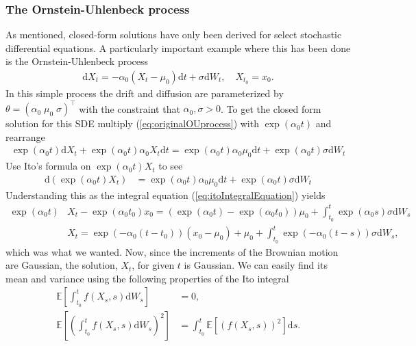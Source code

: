 \subsubsection{The Ornstein-Uhlenbeck process}
As mentioned, closed-form solutions have only been derived for select stochastic differential equations. A particularly important example where this has been done is the Ornstein-Uhlenbeck process
\begin{align}
    \mathrm{d}X_t = -\alpha_0\left(X_t - \mu_0\right)\mathrm{d}t + \sigma \mathrm{d}W_t, \quad X_{t_0} = x_0. \label{eq:originalOUprocess}
\end{align}
In this simple process the drift and diffusion are parameterized by $\theta = \left(\alpha_0\; \mu_0\; \sigma\right)^\top$ with the constraint that $\alpha_0, \sigma>0$.
To get the closed form solution for this SDE multiply (\ref{eq:originalOUprocess}) with $\exp\left(\alpha_0 t\right)$ and rearrange
\begin{align}
    \exp\left(\alpha_0 t\right)\mathrm{d}X_t + \exp\left(\alpha_0 t\right) \alpha_0 X_t \mathrm{d}t = \exp\left(\alpha_0 t\right)\alpha_0\mu_0 \mathrm{d}t + \exp\left(\alpha_0 t\right)\sigma \mathrm{d}W_t
\end{align}
Use Ito's formula on $\exp\left(\alpha_0 t\right)X_t$ to see
\begin{align}
    \mathrm{d}\left(\exp\left(\alpha_0 t\right)X_t\right) &= \exp\left(\alpha_0 t\right)\alpha_0 \mu_0 \mathrm{d}t + \exp\left(\alpha_0 t\right) \sigma \mathrm{d}W_t 
\end{align}
Understanding this as the integral equation (\ref{eq:itoIntegralEquation}) yields
\begin{align}
    \exp\left(\alpha_0 t\right)&X_t - \exp\left(\alpha_0 t_0\right)x_0 = \left(\exp\left(\alpha_0 t\right) - \exp\left(\alpha_0 t_0\right)\right)\mu_0 + \int_{t_0}^t \exp\left(\alpha_0 s\right)\sigma \mathrm{d}W_s \nonumber \\
    &X_t = \exp\left(-\alpha_0\left(t - t_0\right)\right)\left(x_0 - \mu_0\right) + \mu_0 + \int_{t_0}^t \exp\left(-\alpha_0 \left(t - s\right)\right)\sigma \mathrm{d}W_s \label{eq:OU_solution},
\end{align}
which was what we wanted. Now, since the increments of the Brownian motion are Gaussian, the solution, $X_t$, for given $t$ is Gaussian. We can easily find its mean and variance using the following properties of the Ito integral \cite[theorem 3.2.1 and lemma 3.1.5]{Oksendal2003_yu}
\begin{align}
    \mathbb{E}\left[\int_{t_0}^t f(X_s, s) \mathrm{d}W_s\right] &= 0 \label{eq:meanOfItoIntegral},\\
    \mathbb{E}\left[\left(\int_{t_0}^t f(X_s, s) \mathrm{d}W_s\right)^2\right] &= \int_{t_0}^t \mathbb{E}\left[\left(f(X_s, s)\right)^2\right] \mathrm{d}s. \label{eq:ItoIsometry}
\end{align}
